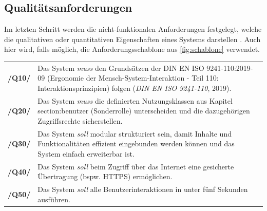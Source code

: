 \subsection*{Qualitätsanforderungen}
\label{section:qualität}
Im letzten Schritt werden die nicht-funktionalen Anforderungen festgelegt, welche die qualitativen oder quantitativen Eigenschaften eines Systems darstellen \cite{balzert2009}. Auch hier wird, falls möglich, die Anforderungsschablone aus \ref{fig:schablone} verwendet.

\begin{center}
        \renewcommand{\arraystretch}{1.5}
        \begin{tabular}{p{}p{}}
                \hline
                \textbf{/Q10/} & Das System \textit{muss} den Grundsätzen der DIN EN ISO
                9241-110:2019-09 (Ergonomie der Mensch-System-Interaktion - Teil 110:
                Interaktionsprinzipien) folgen (\textit{DIN EN ISO 9241-110}, 2019).                                                                                                                \\
                \textbf{/Q20/} & Das System \textit{muss} die definierten Nutzungsklassen aus Kapitel
                section:benutzer (Sonderrolle) unterscheiden und die dazugehörigen Zugriffsrechte
                sicherstellen.                                                                                                                                                                      \\
                \textbf{/Q30/} & Das System \textit{soll} modular strukturiert sein, damit Inhalte und Funktionalitäten effizient eingebunden werden können und das System einfach erweiterbar ist. \\
                \textbf{/Q40/} & Das System \textit{soll} beim Zugriff über das Internet eine gesicherte Übertragung (bspw. HTTPS) ermöglichen.                                                     \\
                \textbf{/Q50/} & Das System \textit{soll} alle Benutzerinteraktionen in unter fünf Sekunden ausführen.                                                                              \\
                \hline
        \end{tabular}
\end{center}
